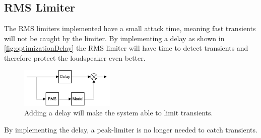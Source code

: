 \subsection*{RMS Limiter}
The RMS limiters implemented have a small attack time, meaning fast transients will not be caught by the limiter. By implementing a delay as shown in \autoref{fig:optimizationDelay} the RMS limiter will have time to detect transients and therefore protect the loudspeaker even better. 
\begin{figure}[H]
\centering
\includegraphics[width=0.4\textwidth]{figures/optimizationDelay.pdf}
\caption{Adding a delay will make the system able to limit transients.}
\label{fig:optimizationDelay}
\end{figure}
By implementing the delay, a peak-limiter is no longer needed to catch transients.



